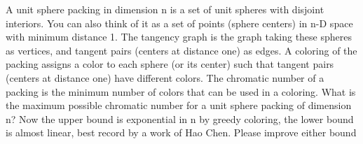 \documentclass{article}
\begin{document}
A unit sphere packing in dimension n is a set of unit spheres with disjoint interiors.  You can also think of it as a set of points (sphere centers) in n-D space with minimum distance 1.  The tangency graph is the graph taking these spheres as vertices, and tangent pairs (centers at distance one) as edges.  A coloring of the packing assigns a color to each sphere (or its center) such that tangent pairs (centers at distance one) have different colors.  The chromatic number of a packing is the minimum number of colors that can be used in a coloring.  What is the maximum possible chromatic number for a unit sphere packing of dimension n?  Now the upper bound is exponential in n by greedy coloring, the lower bound is almost linear, best record by a work of Hao Chen.  Please improve either bound
\end{document}
